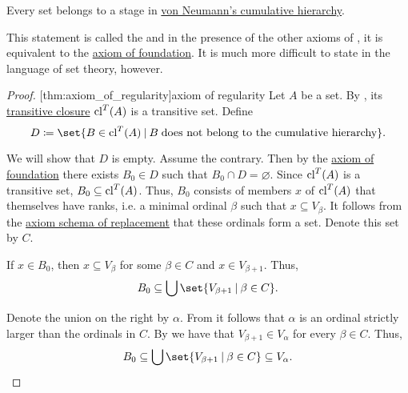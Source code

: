 \begin{theorem}\label{thm:axiom_of_regularity}
  Every set belongs to a stage in \hyperref[def:cumulative_hierarchy]{von Neumann's cumulative hierarchy}.
\end{theorem}
\begin{comments}
  \item This statement is called the  and in the presence of the other axioms of , it is equivalent to the \hyperref[def:zfc/foundation]{axiom of foundation}. It is much more difficult to state in the language of set theory, however.
\end{comments}
\begin{proof}
  [thm:axiom_of_regularity]{axiom of regularity} Let \( A \) be a set. By , its \hyperref[def:transitive_closure_of_a_set]{transitive closure} \( \operatorname{cl}^T(A) \) is a transitive set. Define
  \begin{equation*}
    D \coloneqq \set{ B \in \cl^T(A) \given B \T{does not belong to the cumulative hierarchy} }.
  \end{equation*}

  We will show that \( D \) is empty. Assume the contrary. Then by the \hyperref[def:zfc/foundation]{axiom of foundation} there exists \( B_0 \in D \) such that \( B_0 \cap D = \varnothing \). Since \( \operatorname{cl}^T(A) \) is a transitive set, \( B_0 \subseteq \operatorname{cl}^T(A) \). Thus, \( B_0 \) consists of members \( x \) of \( \operatorname{cl}^T(A) \) that themselves have ranks, i.e. a minimal ordinal \( \beta \) such that \( x \subseteq V_\beta \). It follows from the \hyperref[def:zfc/replacement]{axiom schema of replacement} that these ordinals form a set. Denote this set by \( C \).

  If \( x \in B_0 \), then \( x \subseteq V_\beta \) for some \( \beta \in C \) and \( x \in V_{\beta + 1} \). Thus,
  \begin{equation*}
    B_0 \subseteq \bigcup\set{ V_{\beta + 1} \given \beta \in C }.
  \end{equation*}

  Denote the union on the right by \( \alpha \). From  it follows that \( \alpha \) is an ordinal strictly larger than the ordinals in \( C \). By  we have that \( V_{\beta + 1} \in V_\alpha \) for every \( \beta \in C \). Thus,
  \begin{equation*}
    B_0 \subseteq \bigcup\set{ V_{\beta + 1} \given \beta \in C } \subseteq V_\alpha.
  \end{equation*}


\end{proof}
